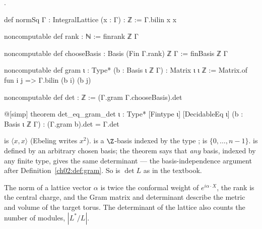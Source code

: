 \begin{definition}\label{ch02:def:ebenorm}
.
\end{definition}
\begin{leancode}
def normSq {Γ : IntegralLattice} (x : Γ) : ℤ := Γ.bilin x x

noncomputable def rank : ℕ := finrank ℤ Γ

noncomputable def chooseBasis : Basis (Fin Γ.rank) ℤ Γ := finBasis ℤ Γ

noncomputable def gram {ι : Type*} (b : Basis ι ℤ Γ) : Matrix ι ι ℤ :=
  Matrix.of fun i j => Γ.bilin (b i) (b j)

noncomputable def det : ℤ := (Γ.gram Γ.chooseBasis).det

@[simp] theorem det_eq_gram_det {ι : Type*} [Fintype ι] [DecidableEq ι] (b : Basis ι ℤ Γ) :
    (Γ.gram b).det = Γ.det
\end{leancode}
\begin{dictionary}
 is $\langle x,x\rangle$ (Ebeling writes $x^2$).   is a
$\Z$-basis indexed by the type ;  is $\{0,\dots,n-1\}$.   is
defined by an arbitrary chosen basis; the theorem  says that \emph{any}
basis, indexed by any finite type, gives the same determinant --- the basis-independence argument
after Definition~\ref{ch02:def:gram}.  So  is $\det L$ as in the textbook.
\end{dictionary}
\begin{physics}
The norm of a lattice vector $\alpha$ is twice the conformal weight of $e^{i\alpha\cdot X}$, the rank is the central charge, and the Gram matrix and determinant describe the metric and volume of the target torus. The determinant of the lattice also counts the number of modules, $|L^*/L|$.
\end{physics}

